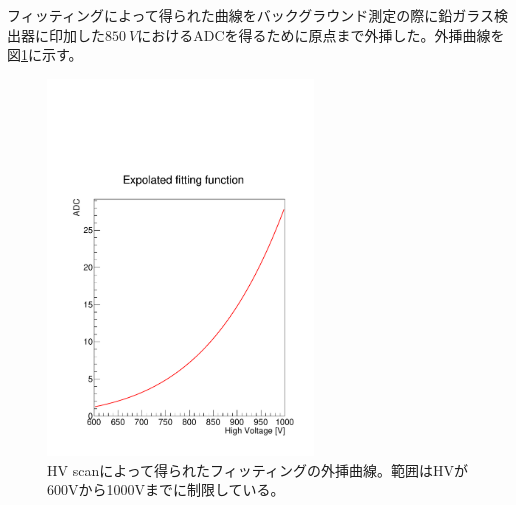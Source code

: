フィッティングによって得られた曲線をバックグラウンド測定の際に鉛ガラス検出器に印加した$\SI{850}{V}$におけるADCを得るために原点まで外挿した。外挿曲線を図\ref{extra}に示す。
\begin{figure}[H]
	\begin{center}
		\includegraphics[width=200pt]{./Figure/EBESAnalysis/extra.pdf}
		\caption[HV scanによって得られたフィッティングの外挿曲線]{HV scanによって得られたフィッティングの外挿曲線。範囲はHVが600Vから1000Vまでに制限している。}
		\label{extra}
	\end{center}
\end{figure}

